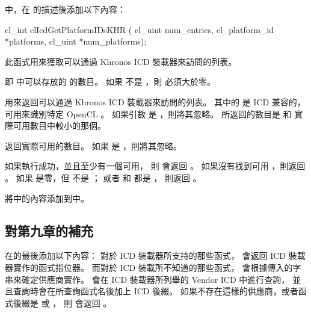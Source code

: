 中，在  的描述後添加以下內容：
\startreplacepar
{}

\startCLFUNC
cl_int clIcdGetPlatformIDsKHR (
			cl_uint num_entries,
			cl_platform_id *platforms,
			cl_uint *num_platforms);
\stopCLFUNC

此函式用來獲取可以通過 Khronos ICD 裝載器來訪問的列表。

 即  中可以存放的  的數目。
如果  不是 ，則  必須大於零。

 用來返回可以通過 Khronos ICD 裝載器來訪問的列表。
其中的  是 ICD 兼容的，
可用來識別特定 OpenCL 。
如果引數  是 ，則將其忽略。
所返回的數目是  和
實際可用數目中較小的那個。

 返回實際可用的數目。
如果  是 ，則將其忽略。

如果執行成功，並且至少有一個可用，
則  會返回 。
如果沒有找到可用 ，則返回 。
如果  是零，但  不是 ；
或者  和  都是 ，
則返回 。
\stopreplacepar

將中的內容添加到中。

{}

\subsection{對第九章的補充}

在的最後添加以下內容：
\startreplacepar
對於 ICD 裝載器所支持的那些函式，
  會返回 ICD 裝載器實作的函式指位器。
而對於 ICD 裝載所不知道的那些函式，
  會根據傳入的字串來確定供應商實作。
  會在 ICD 裝載器所列舉的 Vendor ICD 中進行查詢，
並且查詢時會在所查詢函式名後加上 ICD 後綴。
如果不存在這樣的供應商，或者函式後綴是  或 ，
則  會返回 。
\stopreplacepar

